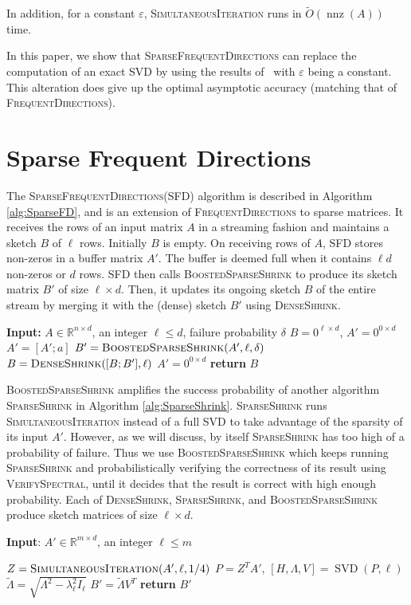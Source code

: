 \documentclass[11pt]{article}
\newcommand{\R}{\mathbb{R}}
\newcommand{\svd}{\operatorname{SVD}}
\newcommand{\nnz}{\operatorname{nnz}}
\newcommand{\eps}{\varepsilon}
\newcommand{\rows}{\operatorname{rows}}
\newcommand{\fd}{\textsc{FrequentDirections}\xspace}
\newcommand{\sfd}{\textsc{SparseFrequentDirections}\xspace}
\newcommand{\SFD}{\textsc{SFD}\xspace}
\newcommand{\si}{\textsc{SimultaneousIteration}\xspace}
\newcommand{\SSh}{\textsc{SparseShrink}\xspace}
\newcommand{\BSSh}{\textsc{BoostedSparseShrink}\xspace}
\newcommand{\DSh}{\textsc{DenseShrink}\xspace}
\newcommand{\vs}{\textsc{VerifySpectral}\xspace}
\begin{document}
In addition, for a constant $\eps$, \si runs in $\tilde{O}(\nnz(A))$ time.

In this paper, we show that \sfd can replace the computation of an exact SVD by using the results of~\cite{musco2015stronger} with $\eps$ being a constant.  This alteration does give up the optimal asymptotic accuracy (matching that of \fd).


\section{Sparse Frequent Directions}
The \sfd (\SFD) algorithm is described in Algorithm \ref{alg:SparseFD}, and is an extension of \fd to sparse matrices.
It receives the rows of an input matrix $A$ in a streaming fashion and maintains a sketch $B$ of $\ell$ rows. Initially $B$ is empty. 
On receiving rows of $A$, \SFD stores non-zeros in a buffer matrix $A'$. 
The buffer is deemed full when it contains $\ell d$ non-zeros or $d$ rows. 
\SFD then calls \BSSh to produce its sketch matrix $B'$ of size $\ell \times d$.
Then, it updates its ongoing sketch $B$ of the entire stream by merging it with the (dense) sketch $B'$ using \DSh.
\begin{algorithm}[H]
\caption{\sfd}
\label{alg:SparseFD}
\begin{algorithmic}
\STATE \textbf{Input:} $A \in \R^{n \times d}$, an integer $\ell \le d$, failure probability $\delta$
\STATE $B = 0^{\ell \times d}$, \; $A' = 0^{0 \times d}$
\STATE $A' = [A' ; a]$
\IF {$\nnz(A') \ge \ell d$ {\bf or} $\rows(A') = d$} \STATE $B' = \BSSh(A',\ell,\delta)$
\STATE $B =  \DSh([B; B'],\ell)$
\STATE $A' = 0^{0 \times d}$
\ENDIF
\ENDFOR
\STATE \textbf{return} $B$ \end{algorithmic}
\end{algorithm}

\BSSh amplifies the success probability of another algorithm \SSh in Algorithm \ref{alg:SparseShrink}.   \SSh runs \si instead of a full SVD to take advantage of the sparsity of its input $A'$.  However, as we will discuss, by itself \SSh has too high of a probability of failure.  
Thus we use \BSSh which keeps running \SSh and probabilistically verifying the correctness of its result using \vs, until it decides that the result is correct with high enough probability. 
Each of \DSh, \SSh, and \BSSh produce sketch matrices of size $\ell \times d$.



\begin{algorithm}[H]
\begin{algorithmic}
\caption{\textsc{SparseShrink}}
\label{alg:SparseShrink}
\STATE \textbf{Input}: $A' \in \R^{m \times d}$, an integer $ \ell \le m$

  \STATE $Z = \si(A',\ell,1/4)$ 
  \STATE $P = Z^TA'$, \; $[H,\Lambda, V] = \svd(P,\ell) $ 
  \STATE $\tilde \Lambda = \sqrt{\Lambda^2 - \lambda_{\ell}^2 I_\ell}$
  \STATE  $B' = \tilde \Lambda V^T$
\STATE \textbf{return} $B'$
\end{algorithmic}
\end{algorithm}
\end{document}
